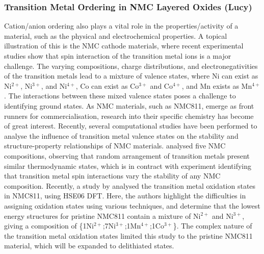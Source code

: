\documentclass[../main.tex]{subfiles}
\begin{document}
\subsubsection{Transition Metal Ordering in NMC Layered Oxides (Lucy)}
\label{sec:TM_ordering_NMC}
Cation/anion ordering also plays a vital role in the properties/activity of a material, such as the physical and electrochemical properties. A topical illustration of this is the NMC cathode materials, where recent experimental studies show that spin interaction of the transition metal ions is a major challenge. \cite{duan2019insights, xiao2018insight} The varying compositions, charge distributions, and electronegativities of the transition metals lead to a mixture of valence states, where Ni can exist as Ni$^{2+}$, Ni$^{3+}$, and Ni$^{4+}$, Co can exist as Co$^{3+}$ and Co$^{4+}$, and Mn exists as Mn$^{4+}$. \cite{xiao2018insight} The interactions between these mixed valence states poses a challenge to identifying ground states. As NMC materials, such as NMC811, emerge as front runners for commercialisation, research into their specific chemistry has become of great interest. Recently, several computational studies have been performed to analyse the influence of transition metal valence states on the stability and structure-property relationships of NMC materials. \cite{sun2017electronic,dixit2017origin,hoang2016defect,dixit2017unraveling} \citeauthor{sun2017electronic} analysed five NMC compositions, observing that random arrangement of transition metals present similar thermodynamic states, which is in contract with experiment identifying that transition metal spin interactions vary the stability of any NMC composition. \cite{sun2017electronic}  Recently, a study by \citeauthor{rana} analysed the transition metal oxidation states in NMC811, using HSE06 DFT. Here, the authors highlight the difficulties in assigning oxidation states using various techniques, and determine that the lowest energy structures for pristine NMC811 contain a mixture of Ni$^{2+}$ and Ni$^{3+}$, giving a composition of \{1Ni$^{2+}$;7Ni$^{3+}$;1Mn$^{4+}$;1Co$^{3+}$\}. \cite{rana} The complex nature of the transition metal oxidation states limited this study to the pristine NMC811 material, which will be expanded to delithiated states.
\end{document}
